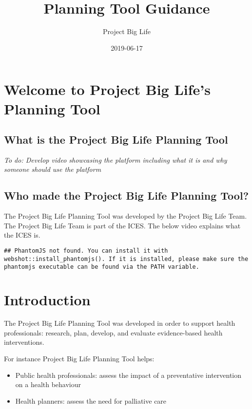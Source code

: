 \documentclass[]{book}
\title{Planning Tool Guidance}
\author{Project Big Life}
\date{2019-06-17}
\providecommand{\tightlist}{%
  \setlength{\itemsep}{0pt}\setlength{\parskip}{0pt}}
\begin{document}
\maketitle

{
\setcounter{tocdepth}{1}
\tableofcontents
}
\chapter{Welcome to Project Big Life's Planning
Tool}\label{welcome-to-project-big-lifes-planning-tool}

\section{What is the Project Big Life Planning
Tool}\label{what-is-the-project-big-life-planning-tool}

\emph{To do: Develop video showcasing the platform including what it is
and why someone should use the platform}

\section{Who made the Project Big Life Planning
Tool?}\label{who-made-the-project-big-life-planning-tool}

The Project Big Life Planning Tool was developed by the Project Big Life
Team. The Project Big Life Team is part of the ICES. The below video
explains what the ICES is.

\begin{verbatim}
## PhantomJS not found. You can install it with webshot::install_phantomjs(). If it is installed, please make sure the phantomjs executable can be found via the PATH variable.
\end{verbatim}

\chapter{Introduction}\label{introduction}

The Project Big Life Planning Tool was developed in order to support
health professionals: research, plan, develop, and evaluate
evidence-based health interventions.

For instance Project Big Life Planning Tool helps:

\begin{itemize}
\tightlist
\item
  Public health professionals: assess the impact of a preventative
  intervention on a health behaviour
\item
  Health planners: assess the need for palliative care
\end{itemize}
\end{document}

